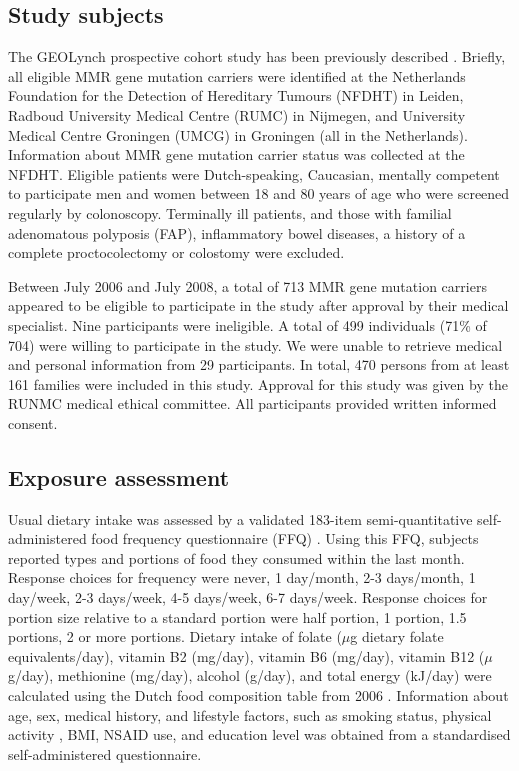 \subsection{Study subjects} %
\noindent The GEOLynch prospective cohort study has been previously described \cite{c612}. Briefly, all eligible MMR gene mutation carriers were identified at the Netherlands Foundation for the Detection of Hereditary Tumours (NFDHT) in Leiden, Radboud University Medical Centre (RUMC) in Nijmegen, and University Medical Centre Groningen (UMCG) in Groningen (all in the Netherlands). Information about MMR gene mutation carrier status was collected at the NFDHT. Eligible patients were Dutch-speaking, Caucasian, mentally competent to participate men and women between 18 and 80 years of age who were screened regularly by colonoscopy. Terminally ill patients, and those with familial adenomatous polyposis (FAP), inflammatory bowel diseases, a history of a complete proctocolectomy or colostomy were excluded.

\noindent Between July 2006 and July 2008, a total of 713 MMR gene mutation carriers appeared to be eligible to participate in the study after approval by their medical specialist. Nine participants were ineligible. A total of 499 individuals (71\% of 704) were willing to participate in the study. We were unable to retrieve medical and personal information from 29 participants. In total, 470 persons from at least 161 families were included in this study. Approval for this study was given by the RUNMC medical ethical committee. All participants provided written informed consent.

\subsection{Exposure assessment} %
\noindent Usual dietary intake was assessed by a validated 183-item semi-quantitative self-administered food frequency questionnaire (FFQ) \cite{c628,c629}. Using this FFQ, subjects reported types and portions of food they consumed within the last month. Response choices for frequency were never, 1 day/month, 2-3 days/month, 1 day/week, 2-3 days/week, 4-5 days/week, 6-7 days/week. Response choices for portion size relative to a standard portion were half portion, 1 portion, 1.5 portions, 2 or more portions. Dietary intake of folate ($\mu$g dietary folate equivalents/day), vitamin B2 (mg/day), vitamin B6 (mg/day), vitamin B12 ($\mu$g/day), methionine (mg/day), alcohol (g/day), and total energy (kJ/day) were calculated using the Dutch food composition table from 2006 \cite{c630}. Information about age, sex, medical history, and lifestyle factors, such as smoking status, physical activity \cite{c631}, BMI, NSAID use, and education level was obtained from a standardised self-administered questionnaire.

